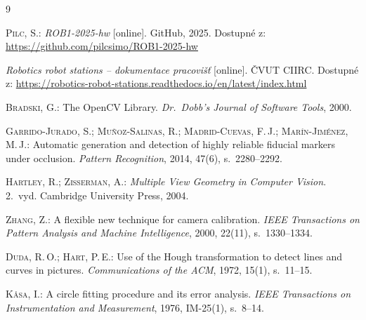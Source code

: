 \documentclass[11pt,a4paper]{article}
\begin{document}
\begin{thebibliography}{9}

\textsc{Pilc, S.}: \emph{ROB1-2025-hw} [online]. GitHub, 2025.
Dostupné z: \url{https://github.com/pilcsimo/ROB1-2025-hw}

\emph{Robotics robot stations -- dokumentace pracovišť} [online]. ČVUT CIIRC.
Dostupné z: \url{https://robotics-robot-stations.readthedocs.io/en/latest/index.html}

\textsc{Bradski, G.}: The OpenCV Library. \emph{Dr.~Dobb's Journal of Software
Tools}, 2000.

\textsc{Garrido-Jurado, S.; Muñoz-Salinas, R.; Madrid-Cuevas, F.\,J.;
Marín-Jiménez, M.\,J.}: Automatic generation and detection of highly reliable
fiducial markers under occlusion. \emph{Pattern Recognition}, 2014, 47(6),
s.~2280--2292.

\textsc{Hartley, R.; Zisserman, A.}: \emph{Multiple View Geometry in Computer
Vision}. 2.~vyd. Cambridge University Press, 2004.

\textsc{Zhang, Z.}: A flexible new technique for camera calibration.
\emph{IEEE Transactions on Pattern Analysis and Machine Intelligence}, 2000,
22(11), s.~1330--1334.

\textsc{Duda, R.\,O.; Hart, P.\,E.}: Use of the Hough transformation to detect
lines and curves in pictures. \emph{Communications of the ACM}, 1972, 15(1),
s.~11--15.

\textsc{Kåsa, I.}: A circle fitting procedure and its error analysis.
\emph{IEEE Transactions on Instrumentation and Measurement}, 1976, IM-25(1),
s.~8--14.

\end{thebibliography}
\end{document}
